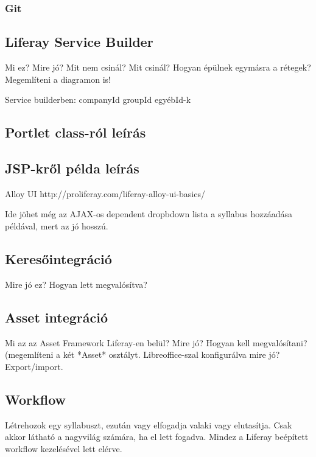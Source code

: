 \documentclass[hidelinks, 12pt, a4paper]{report}
\begin{document}
\subsubsection{Git}

\subsection{Liferay Service Builder}

Mi ez? Mire jó? Mit nem csinál? Mit csinál?
Hogyan épülnek egymásra a rétegek? Megemlíteni a diagramon is!

Service builderben:
companyId
groupId
egyébId-k

\subsection{Portlet class-ról leírás}

\subsection{JSP-kről példa leírás}

Alloy UI http://proliferay.com/liferay-alloy-ui-basics/

Ide jöhet még az AJAX-os dependent dropbdown lista a syllabus hozzáadása példával, mert az jó hosszú.

\subsection{Keresőintegráció}

Mire jó ez? Hogyan lett megvalósítva?

\subsection{Asset integráció}

Mi az az Asset Framework Liferay-en belül? Mire jó? Hogyan kell megvalósítani? (megemlíteni a két *Asset* osztályt.
Libreoffice-szal konfigurálva mire jó? Export/import.

\subsection{Workflow}

Létrehozok egy syllabuszt, ezután vagy elfogadja valaki vagy elutasítja. Csak akkor látható a nagyvilág számára, ha el lett fogadva. Mindez a Liferay beépített workflow kezelésével lett elérve.
\end{document}
